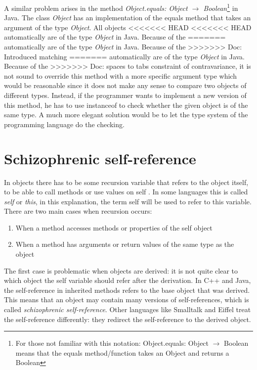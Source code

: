 A similar problem arises in the method \emph{Object.equals: Object
$\rightarrow$ Boolean}\footnote{For those not familiar with this
notation: Object.equals: Object $\rightarrow$ Boolean means that
the equals method/function takes an Object and returns a Boolean}
in Java. The class \emph{Object} has an implementation of the equals
method that takes an argument of the type \emph{Object}. All objects
<<<<<<< HEAD
<<<<<<< HEAD
automatically are of the type \emph{Object} in Java.	Because of the
=======
automatically are of the type \emph{Object} in Java.  Because of the
>>>>>>> Doc: Introduced matching
=======
automatically are of the type \emph{Object} in Java.	Because of the
>>>>>>> Doc: spaces to tabs
constraint of contravariance, it is not sound to override this method
with a more specific argument type which would be reasonable since it does
not make any sense to compare two objects of different types. Instead,
if the programmer wants to implement a new version of this method, he
has to use instanceof to check whether the given object is of the same
type. A much more elegant solution would be to let the type system of
the programming language do the checking.\\

\section{Schizophrenic self-reference}
\label{sec:schizoReferences}

In objects there has to be some recursion variable that refers to the
object itself, to be able to call methods or use values on self . 
In some languages this is called \emph{self} or \emph{this}, in
this explanation, the term self will be used to refer to this variable. \\

There are two main cases when recursion occurs:
\begin{enumerate}
\item When a method accesses methods or properties of the self object
\item When a method has arguments or return values of the same type as the object
\end{enumerate}

The first case is problematic when objects are derived: it is not quite
clear to which object the self variable should refer after the derivation.
In C++ and Java, the self-reference in inherited methods refers to the
base object that was derived. This means that an object may contain
many versions of self-references, which is called \emph{schizophrenic
self-reference}. Other languages like Smalltalk and Eiffel treat the
self-reference differently: they redirect the self-reference to the
derived object. \\

